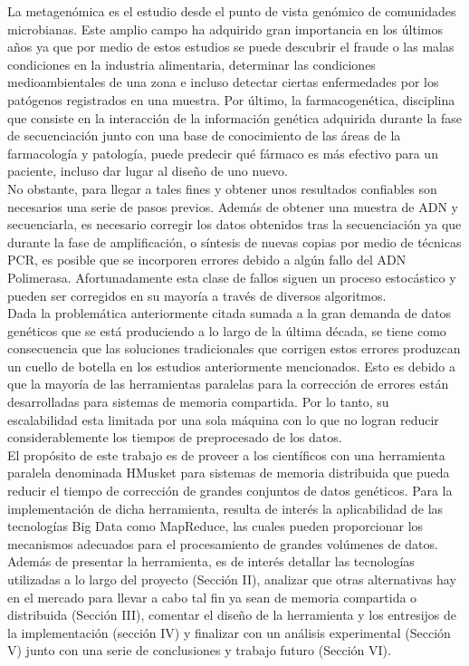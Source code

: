 \documentclass[conference]{IEEEtran}
\begin{document}
La metagenómica es el estudio desde el punto de vista genómico de comunidades microbianas. Este amplio campo ha adquirido gran importancia en los últimos años ya que por medio de estos estudios se puede descubrir el fraude o las malas condiciones en la industria alimentaria, determinar las condiciones medioambientales de una zona e incluso detectar ciertas enfermedades por los patógenos registrados en una muestra. Por último, la farmacogenética, disciplina que consiste en la interacción de la información genética adquirida durante la fase de secuenciación junto con una base de conocimiento de las áreas de la farmacología y patología, puede predecir qué fármaco es más efectivo para un paciente, incluso dar lugar al diseño de uno nuevo.
\\

No obstante, para llegar a tales fines y obtener unos resultados confiables son necesarios una serie de pasos previos. Además de obtener una muestra de ADN y secuenciarla, es necesario corregir los datos obtenidos tras la secuenciación ya que durante la fase de amplificación, o síntesis de nuevas copias por medio de técnicas PCR\cite{pcr}, es posible que se incorporen errores debido a algún fallo del ADN Polimerasa\cite{adn_polimerasa}. Afortunadamente esta clase de fallos siguen un proceso estocástico y pueden ser corregidos en su mayoría a través de diversos algoritmos.
\\

Dada la problemática anteriormente citada sumada a la gran demanda de datos genéticos que se está produciendo a lo largo de la última década, se tiene como consecuencia que las soluciones tradicionales que corrigen estos errores produzcan un cuello de botella en los estudios anteriormente mencionados. Esto es debido a que la mayoría de las herramientas paralelas para la corrección de errores están desarrolladas para sistemas de memoria compartida. Por lo tanto, su escalabilidad esta limitada por una sola máquina con lo que no logran reducir considerablemente los tiempos de preprocesado de los datos.
\\

El propósito de este trabajo es de proveer a los científicos con una herramienta paralela denominada HMusket para sistemas de memoria distribuida que pueda reducir el tiempo de corrección de grandes conjuntos de datos genéticos. Para la implementación de dicha herramienta, resulta de interés la aplicabilidad de las tecnologías Big Data como MapReduce, las cuales pueden proporcionar los mecanismos adecuados para el procesamiento de grandes volúmenes de datos. Además de presentar la herramienta, es de interés detallar las tecnologías utilizadas a lo largo del proyecto (Sección II), analizar que otras alternativas hay en el mercado para llevar a cabo tal fin ya sean de memoria compartida o distribuida (Sección III), comentar el diseño de la herramienta y los entresijos de la implementación (sección IV) y finalizar con un análisis experimental (Sección V)  junto con una serie de conclusiones y trabajo futuro (Sección VI).\\
\end{document}
